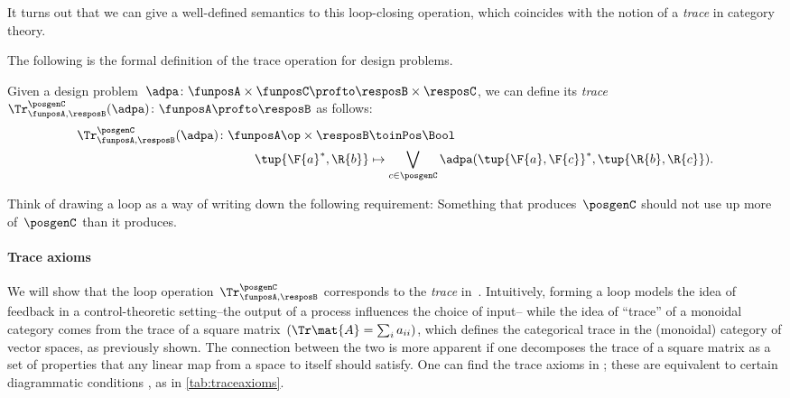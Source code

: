 It turns out that we can give a well-defined semantics to this loop-closing operation, which coincides with the notion of a \emph{trace} in category theory.

The following is the formal definition of the trace operation for design problems.


\begin{definition}
    \label{def:dp-trace}
    Given a design problem~$\adpa\colon \funposA \times \funposC \profto \resposB \times \resposC$, we can define
    its \emph{trace}~$\Tr_{\funposA,\resposB}^\posgenC(\adpa) \colon \funposA \profto \resposB$ as follows:
    \begin{equation}
        \label{eq:tracedef}
        \begin{aligned}
            \Tr_{\funposA,\resposB}^\posgenC(\adpa) \colon  \funposA\op \times \resposB &\toinPos \Bool \\
            \tup{\F{a}^*, \R{b}} &\mapsto \bigvee_{c\in \posgenC}
            \adpa(\tup{\F{a}, \F{c}}^*,
            \tup{\R{b}, \R{c}}).
        \end{aligned}
    \end{equation}
\end{definition}


Think of drawing a loop as a way of writing down the following requirement: Something that produces~$\posgenC$ should not use up more of~$\posgenC$ than it produces.


\paragraph{Trace axioms}
We will show that the loop operation~$\Tr_{\funposA,\resposB}^\posgenC$ corresponds to the \emph{trace} in~\DP.
Intuitively, forming a loop models the idea of feedback in a control-theoretic setting--the output of a process influences the choice of input--
while the idea of ``trace'' of a monoidal category comes from the trace of a square matrix~$(\Tr\mat{A} = \sum_i a_{ii})$, which defines the categorical trace in the (monoidal) category of vector spaces, as previously shown.
The connection between the two is more apparent if one decomposes the trace of a square matrix as a set of properties that any linear map from a space to itself should satisfy.
One can find the trace axioms in  \cite{mac2013categories};
these are equivalent to certain diagrammatic conditions \cite{joyal96}, as in \cref{tab:traceaxioms}.


